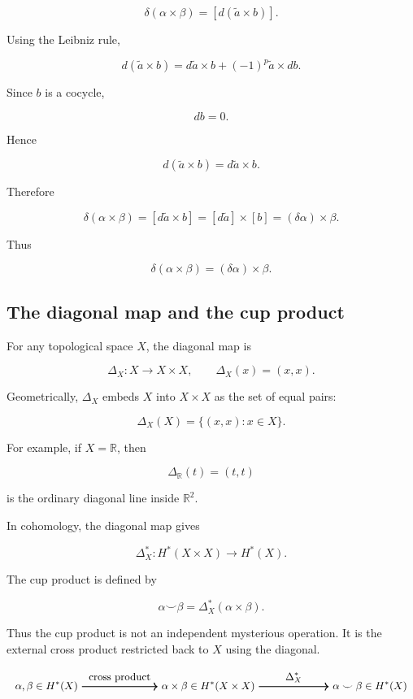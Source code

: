 \documentclass[12pt,a4paper]{article}
\theoremstyle{notespace}
\begin{document}
\[
\delta(\alpha\times\beta)
=
[d(\widetilde a\times b)].
\]

Using the Leibniz rule,

\[
d(\widetilde a\times b)
=
d\widetilde a\times b
+
(-1)^p\widetilde a\times db.
\]

Since \(b\) is a cocycle,

\[
db=0.
\]

Hence

\[
d(\widetilde a\times b)
=
d\widetilde a\times b.
\]

Therefore

\[
\delta(\alpha\times\beta)
=
[d\widetilde a\times b]
=
[d\widetilde a]\times[b]
=
(\delta\alpha)\times\beta.
\]

Thus

\[
\boxed{
	\delta(\alpha\times\beta)
	=
	(\delta\alpha)\times\beta.
}
\]

\subsection{The diagonal map and the cup product}

For any topological space \(X\), the diagonal map is

\[
\Delta_X:X\to X\times X,
\qquad
\Delta_X(x)=(x,x).
\]

Geometrically, \(\Delta_X\) embeds \(X\) into \(X\times X\) as the set of equal pairs:

\[
\Delta_X(X)=\{(x,x):x\in X\}.
\]

For example, if \(X=\mathbb R\), then

\[
\Delta_{\mathbb R}(t)=(t,t)
\]

is the ordinary diagonal line inside \(\mathbb R^2\).

In cohomology, the diagonal map gives

\[
\Delta_X^*:H^*(X\times X)\to H^*(X).
\]

The cup product is defined by

\[
\boxed{
	\alpha\smile\beta
	=
	\Delta_X^*(\alpha\times\beta).
}
\]

Thus the cup product is not an independent mysterious operation. It is the external cross product restricted back to \(X\) using the diagonal.

\[
\begin{tikzpicture}[scale=1.0, every node/.style={font=\small}]
	\node (A) at (0,0) {\(\alpha,\beta\in H^*(X)\)};
	\node (B) at (5,0) {\(\alpha\times\beta\in H^*(X\times X)\)};
	\node (C) at (10,0) {\(\alpha\smile\beta\in H^*(X)\)};
	
	\draw[->, thick] (A) -- node[above] {cross product} (B);
	\draw[->, thick] (B) -- node[above] {\(\Delta_X^*\)} (C);
\end{tikzpicture}
\]
\end{document}
